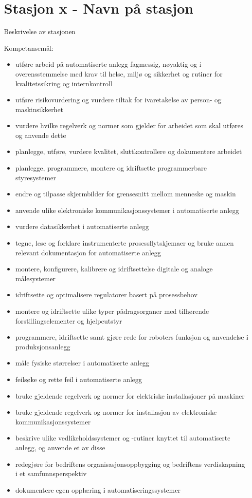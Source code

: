 
\noindent
\section*{Stasjon x - Navn på stasjon}

\vskip 5pt
Beskrivelse av stasjonen

Kompetansemål:
\begin{itemize}[noitemsep]

	\item utføre arbeid på automatiserte anlegg fagmessig, nøyaktig og i overensstemmelse med krav til helse, miljø og sikkerhet og rutiner for kvalitetssikring og internkontroll
	\item utføre risikovurdering og vurdere tiltak for ivaretakelse av person- og maskinsikkerhet
	\item vurdere hvilke regelverk og normer som gjelder for arbeidet som skal utføres og anvende dette
	\item planlegge, utføre, vurdere kvalitet, sluttkontrollere og dokumentere arbeidet
	\item planlegge, programmere, montere og idriftsette programmerbare styresystemer
	\item endre og tilpasse skjermbilder for grensesnitt mellom menneske og maskin
	\item anvende ulike elektroniske kommunikasjonssystemer i automatiserte anlegg
	\item vurdere datasikkerhet i automatiserte anlegg
	\item tegne, lese og forklare instrumenterte prosessflytskjemaer og bruke annen relevant dokumentasjon for automatiserte anlegg
	\item montere, konfigurere, kalibrere og idriftsettelse digitale og analoge målesystemer
	\item idriftsette og optimalisere regulatorer basert på prosessbehov
	\item montere og idriftsette ulike typer pådragsorganer med tilhørende forstillingselementer og hjelpeutstyr
	\item programmere, idriftsette samt gjøre rede for roboters funksjon og anvendelse i produksjonsanlegg
	\item måle fysiske størrelser i automatiserte anlegg
	\item feilsøke og rette feil i automatiserte anlegg
	\item bruke gjeldende regelverk og normer for elektriske installasjoner på maskiner
	\item bruke gjeldende regelverk og normer for installasjon av elektroniske kommunikasjonssystemer
	\item beskrive ulike vedlikeholdssystemer og -rutiner knyttet til automatiserte anlegg, og anvende et av disse
	\item redegjøre for bedriftens organisasjonsoppbygging og bedriftens verdiskapning i et samfunnsperspektiv
	\item dokumentere egen opplæring i automatiseringssystemer
\end{itemize}

